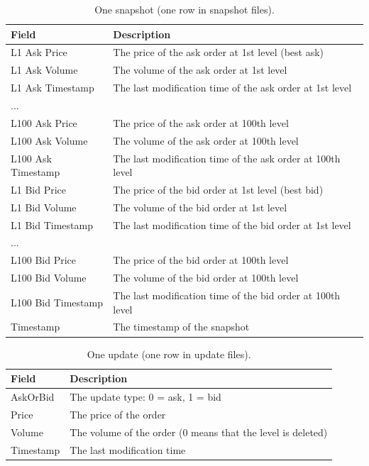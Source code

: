 \documentclass[11pt,a4paper,oneside]{article}
\begin{document}
\begin{table}[tbh]
  \centering
  \begin{tabular}{|l|l|}
    \hline
    Field              & Description \\
    \hline
    L1 Ask Price       & The price of the ask order at 1st level (best ask) \\
    \hline
    L1 Ask Volume      & The volume of the ask order at 1st level \\
    \hline
    L1 Ask Timestamp   & The last modification time of the ask order at 1st level \\
    \hline
    ... \\
    \hline
    L100 Ask Price     & The price of the ask order at 100th level \\
    \hline
    L100 Ask Volume    & The volume of the ask order at 100th level \\
    \hline
    L100 Ask Timestamp & The last modification time of the ask order at 100th level \\
    \hline
    L1 Bid Price       & The price of the bid order at 1st level (best bid) \\
    \hline
    L1 Bid Volume      & The volume of the bid order at 1st level \\
    \hline
    L1 Bid Timestamp   & The last modification time of the bid order at 1st level \\
    \hline
    ... \\
    \hline
    L100 Bid Price     & The price of the bid order at 100th level \\
    \hline
    L100 Bid Volume    & The volume of the bid order at 100th level \\
    \hline
    L100 Bid Timestamp & The last modification time of the bid order at 100th level \\
    \hline
    Timestamp          & The timestamp of the snapshot \\
    \hline
  \end{tabular}
  \caption{One snapshot (one row in snapshot files).}
  \label{table:1}
\end{table}

\begin{table}[tbh]
  \centering
  \begin{tabular}{|l|l|}
    \hline
    Field       & Description \\
    \hline
    AskOrBid    & The update type: 0 = ask, 1 = bid \\
    \hline
    Price       & The price of the order \\
    \hline
    Volume      & The volume of the order (0 means that the level is deleted)\\
    \hline
    Timestamp   & The last modification time \\
    \hline
  \end{tabular}
  \caption{One update (one row in update files).}
  \label{table:2}
\end{table}
\end{document}
